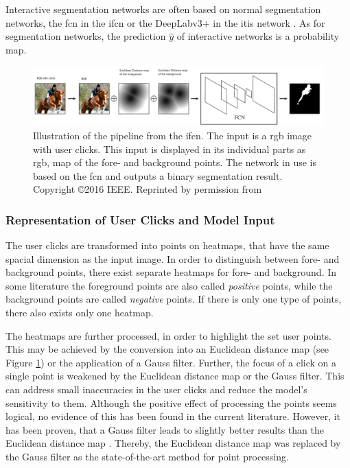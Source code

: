 Interactive segmentation networks are often based on normal segmentation networks, \eg the \gls{fcn} in the \gls{ifcn} \cite{Xu16-InteractiveObjectSelection} or the DeepLabv3+ in the \gls{itis} network \cite{MVL18-ITIS}.
As for segmentation networks, the prediction $\hat{y}$ of interactive networks is a probability map.

\begin{figure}
	\includegraphics[width=\linewidth]{figures/chap232_ifcn.png}
	\caption[Interactively Fully Convolutional Network]{
		Illustration of the pipeline from the \gls{ifcn}.
		The input is a \gls{rgb} image with user clicks.
		This input is displayed in its individual parts as \gls{rgb}, map of the fore- and background points.
		The network in use is based on the \gls{fcn} and outputs a binary segmentation result.
		Copyright \copyright 2016 IEEE. Reprinted by permission from \cite{Xu16-InteractiveObjectSelection}
	}\label{fig:ch2:sec3:ifcn}
\end{figure}

\subsubsection{Representation of User Clicks and Model Input}
The user clicks are transformed into points on heatmaps, that have the same spacial dimension as the input image.
In order to distinguish between fore- and background points, there exist separate heatmaps for fore- and background.
In some literature the foreground points are also called \textit{positive} points, while the background points are called \textit{negative} points.
If there is only one type of points, there also exists only one heatmap.

The heatmaps are further processed, in order to highlight the set user points.
This may be achieved by the conversion into an Euclidean distance map \cite{Dan80-EuclideanDistanceMapping} (see Figure \ref{fig:ch2:sec3:ifcn}) or the application of a Gauss filter.
Further, the focus of a click on a single point is weakened by the Euclidean distance map or the Gauss filter.
This can address small inaccuracies in the user clicks and reduce the model's sensitivity to them.
Although the positive effect of processing the points seems logical, no evidence of this has been found in the current literature.
However, it has been proven, that a Gauss filter leads to slightly better results than the Euclidean distance map \cite{Man18-DEXTR} \cite{MVL18-ITIS}.
Thereby, the Euclidean distance map was replaced by the Gauss filter as the state-of-the-art method for point processing.

